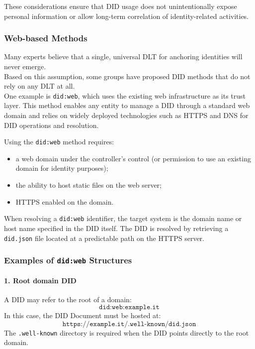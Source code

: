 \noindent
These considerations ensure that DID usage does not unintentionally expose personal information or allow long-term correlation of identity-related activities.
\newpage

\subsubsection {Web-based Methods}
Many experts believe that a single, universal DLT for anchoring identities will never emerge. \\
Based on this assumption, some groups have proposed DID methods that do not rely on any DLT at all.\\
One example is \texttt{did:web}, which uses the existing web infrastructure as its trust layer. This method enables any entity to manage a DID through a standard web domain and relies on widely deployed technologies such as HTTPS and DNS for DID operations and resolution.
\bigskip

\noindent
Using the \texttt{did:web} method requires:
\begin{itemize}
    \item a web domain under the controller's control (or permission to use an existing domain for identity purposes);
    \item the ability to host static files on the web server;
    \item HTTPS enabled on the domain.
\end{itemize}

\noindent
When resolving a \texttt{did:web} identifier, the target system is the domain name or host name specified in the DID itself. The DID is resolved by retrieving a \texttt{did.json} file located at a predictable path on the HTTPS server.

\subsubsection*{Examples of \texttt{did:web} Structures}

\paragraph{1. Root domain DID}  
A DID may refer to the root of a domain:
\[
\texttt{did:web:example.it}
\]
In this case, the DID Document must be hosted at:
\[
\texttt{https://example.it/.well-known/did.json}
\]
The \texttt{.well-known} directory is required when the DID points directly to the root domain.

